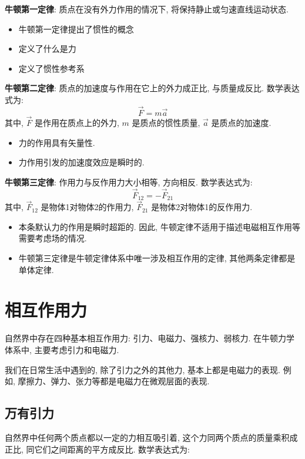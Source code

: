 \documentclass[
  a4paper,
]{ctexrep}
\providecommand{\tightlist}{%
  \setlength{\itemsep}{0pt}\setlength{\parskip}{0pt}}
\begin{document}
\textbf{牛顿第一定律}: 质点在没有外力作用的情况下,
将保持静止或匀速直线运动状态.

\begin{itemize}
\tightlist
\item
  牛顿第一定律提出了惯性的概念
\item
  定义了什么是力
\item
  定义了惯性参考系
\end{itemize}

\textbf{牛顿第二定律}: 质点的加速度与作用在它上的外力成正比,
与质量成反比. 数学表达式为: \[\vec{F} = m \vec{a}\] 其中, \(\vec{F}\)
是作用在质点上的外力, \(m\) 是质点的惯性质量, \(\vec{a}\)
是质点的加速度.

\begin{itemize}
\tightlist
\item
  力的作用具有矢量性.
\item
  力作用引发的加速度效应是瞬时的.
\end{itemize}

\textbf{牛顿第三定律}: 作用力与反作用力大小相等, 方向相反. 数学表达式为:
\[\vec{F}_{12} = -\vec{F}_{21}\] 其中, \(\vec{F}_{12}\)
是物体1对物体2的作用力, \(\vec{F}_{21}\) 是物体2对物体1的反作用力.

\begin{itemize}
\tightlist
\item
  本条默认力的作用是瞬时超距的. 因此,
  牛顿定律不适用于描述电磁相互作用等需要考虑场的情况.
\item
  牛顿第三定律是牛顿定律体系中唯一涉及相互作用的定律,
  其他两条定律都是单体定律.
\end{itemize}

\section{相互作用力}\label{ux76f8ux4e92ux4f5cux7528ux529b}

自然界中存在四种基本相互作用力: 引力、电磁力、强核力、弱核力.
在牛顿力学体系中, 主要考虑引力和电磁力.

我们在日常生活中遇到的, 除了引力之外的其他力, 基本上都是电磁力的表现.
例如, 摩擦力、弹力、张力等都是电磁力在微观层面的表现.

\subsection{万有引力}\label{ux4e07ux6709ux5f15ux529b}

自然界中任何两个质点都以一定的力相互吸引着,
这个力同两个质点的质量乘积成正比, 同它们之间距离的平方成反比.
数学表达式为:
\end{document}
